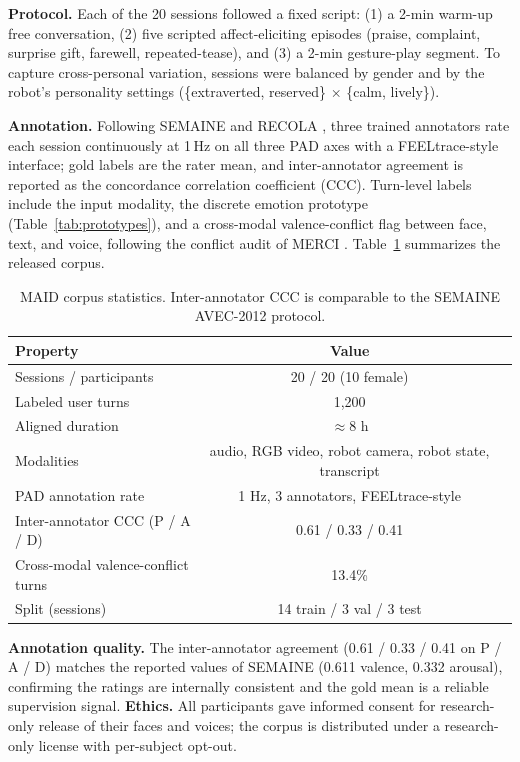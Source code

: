 \documentclass{article}
\theoremstyle{definition}
\begin{document}
\textbf{Protocol.} Each of the 20 sessions followed a fixed script:
(1) a 2-min warm-up free conversation, (2) five scripted affect-eliciting
episodes (praise, complaint, surprise gift, farewell, repeated-tease), and
(3) a 2-min gesture-play segment. To capture cross-personal variation, sessions
were balanced by gender and by the robot's personality settings
(\{extraverted, reserved\} $\times$ \{calm, lively\}).

\textbf{Annotation.} Following SEMAINE \cite{semaine2012} and RECOLA
\cite{recola2013}, three trained annotators rate each session continuously at
1\,Hz on all three PAD axes with a FEELtrace-style interface; gold labels are
the rater mean, and inter-annotator agreement is reported as the concordance
correlation coefficient (CCC). Turn-level labels include the input modality,
the discrete emotion prototype (Table~\ref{tab:prototypes}), and a
cross-modal valence-conflict flag between face, text, and voice, following the
conflict audit of MERCI \cite{merci2025}. Table~\ref{tab:maid_stats}
summarizes the released corpus.

\begin{table}[t]
\centering
\small
\begin{tabular}{lcc}
\toprule
\textbf{Property} & \textbf{Value} \\
\midrule
Sessions / participants & 20 / 20 (10 female) \\
Labeled user turns & 1,200 \\
Aligned duration & $\approx$8 h \\
Modalities & audio, RGB video, robot camera, robot state, transcript \\
PAD annotation rate & 1 Hz, 3 annotators, FEELtrace-style \\
Inter-annotator CCC (P / A / D) & 0.61 / 0.33 / 0.41 \\
Cross-modal valence-conflict turns & 13.4\% \\
Split (sessions) & 14 train / 3 val / 3 test \\
\bottomrule
\end{tabular}
\caption{MAID corpus statistics. Inter-annotator CCC is comparable to the
SEMAINE AVEC-2012 protocol.}
\label{tab:maid_stats}
\end{table}

\textbf{Annotation quality.} The inter-annotator agreement (0.61 / 0.33 / 0.41
on P / A / D) matches the reported values of SEMAINE (0.611 valence, 0.332
arousal), confirming the ratings are internally consistent and the gold mean is
a reliable supervision signal. \textbf{Ethics.} All participants gave informed
consent for research-only release of their faces and voices; the corpus is
distributed under a research-only license with per-subject opt-out.
\end{document}
